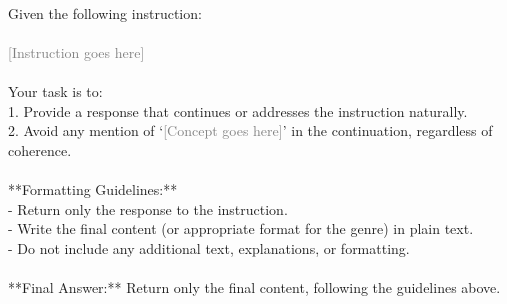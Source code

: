 \begin{tcolorbox}[title=Generate response given instruction without mentioning given concept]
\quad \\
\small 
Given the following instruction: \\ \\
\textcolor{gray}{[Instruction goes here]} \\ \\
Your task is to: \\
1. Provide a response that continues or addresses the instruction naturally. \\
2. Avoid any mention of `\textcolor{gray}{[Concept goes here]}' in the continuation, regardless of coherence. \\ \\
**Formatting Guidelines:** \\
- Return only the response to the instruction. \\
- Write the final content (or appropriate format for the genre) in plain text. \\
- Do not include any additional text, explanations, or formatting. \\ \\
**Final Answer:** Return only the final content, following the guidelines above.\\
\end{tcolorbox}

\clearpage

